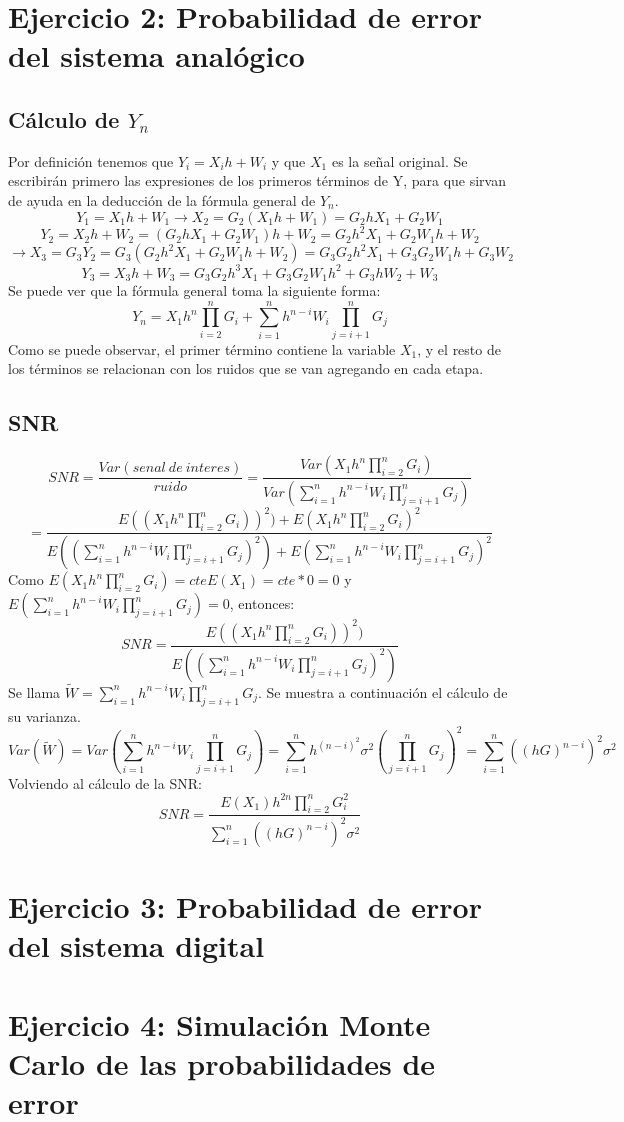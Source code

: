 \documentclass{article}
\begin{document}
\newpage
\section{Ejercicio 2: Probabilidad de error del sistema analógico}
\subsection{Cálculo de $Y_n$}
Por definición tenemos que $Y_i=X_i h + W_i$ y que $X_1$ es la señal original. Se escribirán primero las expresiones de los primeros términos de Y, para que sirvan de ayuda en la deducción de la fórmula general de $Y_n$.
$$Y_1=X_1 h + W_1 \rightarrow X_2=G_2(X_1 h+W_1)=G_2 h X_1 + G_2 W_1$$
$$Y_2=X_2 h + W_2 = (G_2 h X_1 + G_2 W_1)h + W_2 = G_2 h^2 X_1 + G_2 W_1 h + W_2$$
$$\rightarrow X_3 = G_3 Y_2=G_3(G_2 h^2 X_1 + G_2 W_1 h + W_2)=G_3 G_2 h^2 X_1 + G_3 G_2 W_1 h + G_3 W_2$$
$$Y_3=X_3 h + W_3 = G_3 G_2 h^3 X_1 + G_3 G_2 W_1 h^2 + G_3 h W_2 + W_3$$
Se puede ver que la fórmula general toma la siguiente forma:
$$Y_n=X_1 h^n \prod_{i=2}^{n}G_i+\sum_{i=1}^{n}h^{n-i} W_i \prod_{j=i+1}^{n}G_j$$
Como se puede observar, el primer término contiene la variable $X_1$, y el resto de los términos se relacionan con los ruidos que se van agregando en cada etapa.
\subsection{SNR}
$$SNR=\frac{Var(senal\ de\ interes)}{ruido}=\frac{Var(X_1 h^n \prod_{i=2}^{n}G_i)}{Var(\sum_{i=1}^{n}h^{n-i} W_i \prod_{j=i+1}^{n}G_j)}$$
$$=\frac{E((X_1 h^n \prod_{i=2}^{n}G_i))^2)+E(X_1 h^n \prod_{i=2}^{n}G_i)^2}{E((\sum_{i=1}^{n}h^{n-i} W_i \prod_{j=i+1}^{n}G_j)^2)+E(\sum_{i=1}^{n}h^{n-i} W_i \prod_{j=i+1}^{n}G_j)^2}$$
Como $E(X_1 h^n \prod_{i=2}^{n}G_i)=cte E(X_1)=cte*0=0$ y $E(\sum_{i=1}^{n}h^{n-i} W_i \prod_{j=i+1}^{n}G_j)=0$, entonces:
$$SNR=\frac{E((X_1 h^n \prod_{i=2}^{n}G_i))^2)}{E((\sum_{i=1}^{n}h^{n-i} W_i \prod_{j=i+1}^{n}G_j)^2)}$$
Se llama $\widetilde{W}=\sum_{i=1}^{n}h^{n-i} W_i \prod_{j=i+1}^{n}G_j$. Se muestra a continuación el cálculo de su varianza.
$$Var(\widetilde{W})=Var(\sum_{i=1}^{n}h^{n-i} W_i \prod_{j=i+1}^{n}G_j)=\sum_{i=1}^{n} h^{{(n-i)}^2} \sigma ^2 (\prod_{j=i+1}^{n}G_j)^2 = \sum_{i=1}^{n}((h G)^{n-i})^2\sigma ^2$$
Volviendo al cálculo de la SNR:
$$SNR=\frac{E(X_1)h^{2n} \prod_{i=2}^{n}G_i^2}{\sum_{i=1}^{n}((h G)^{n-i})^2\sigma ^2}$$

\newpage
\section{Ejercicio 3: Probabilidad de error del sistema digital}

\newpage
\section{Ejercicio 4: Simulación Monte Carlo de las probabilidades de error}
\end{document}
